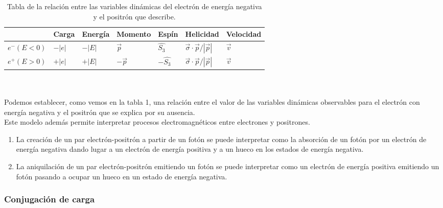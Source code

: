 \documentclass[11pt,letterpaper]{article}     %
\begin{document}
\begin{table}[htbp] \label{table:1}
\begin{center} 
\begin{tabular}{|l|l|l|l|l|l|l|}
\hline 
{}& Carga & Energía & Momento & Espín & Helicidad & Velocidad \\
\hline 
$e^-(E<0)$ & $-|e|$ & $-|E|$ & $\vec{p}$& $\hat{S_3}$ & $\vec{\sigma} \cdot \vec{p}/|\vec{p}|$ & $\vec{v}$\\ \hline
$e^+(E>0)$ & $+|e|$ & $+|E|$ & $-\vec{p}$& $-\hat{S_3}$ & $\vec{\sigma} \cdot \vec{p}/|\vec{p}|$ & $\vec{v}$\\ \hline
\end{tabular}
\caption{Tabla de la relación entre las variables dinámicas del electrón de energía negativa y el positrón que describe.} 
\end{center} 
\end{table} \\ \\
Podemos establecer, como vemos en la tabla 1, una relación entre el valor de las variables dinámicas observables para el electrón con energía negativa y el positrón que se explica por su ausencia.  \\
Este modelo además permite interpretar procesos electromagnéticos entre electrones y positrones. 
\begin{enumerate}
\item La creación de un par electrón-positrón a partir de un fotón se puede interpretar como la absorción de un fotón por un electrón de energía negativa dando lugar a un electrón de energía positiva y a un hueco en los estados de energía negativa.
\item La aniquilación de un par electrón-positrón emitiendo un fotón se puede interpretar como un electrón de energía positiva emitiendo un fotón pasando a ocupar un hueco en un estado de energía negativa.
\end{enumerate} 





\subsubsection{Conjugación de carga} %
\end{document}
